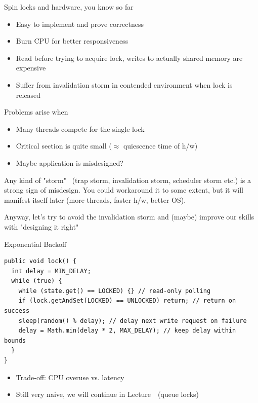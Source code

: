\begin{frame}[fragile]{Spin locks and hardware, you know so far}

\begin{itemize}
  \item Easy to implement and prove correctness
  \item Burn CPU for better responsiveness
  \item Read before trying to acquire lock, writes to actually shared memory are expensive
  \item Suffer from invalidation storm in contended environment when lock is released
\end{itemize}

\pause

Problems arise when
\begin{itemize}
  \pause
  \item Many threads compete for the single lock
  \pause
  \item Critical section is quite small ($\approx$ quiescence time of h/w)
  \pause
  \item Maybe application is misdesigned?
\end{itemize}

\pause

Any kind of "storm" \ (trap storm, invalidation storm, scheduler storm etc.) is a strong sign of misdesign. \pause
You could workaround it to some extent, but it will manifest itself later (more threads, faster h/w, better OS).

\pause
Anyway, let's try to avoid the invalidation storm and (maybe) improve our skills with "designing it right"

\end{frame}


% 
% 
% 


\begin{frame}[fragile]{Exponential Backoff}

\begin{verbatim}
public void lock() {
  int delay = MIN_DELAY;
  while (true) {
    while (state.get() == LOCKED) {} // read-only polling
    if (lock.getAndSet(LOCKED) == UNLOCKED) return; // return on success
    sleep(random() % delay); // delay next write request on failure
    delay = Math.min(delay * 2, MAX_DELAY); // keep delay within bounds    
  }
}
\end{verbatim}

\pause
\begin{itemize}
  \item Trade-off: CPU overuse vs. latency
  \pause
  \item Still very naive, we will continue in Lecture~\advancedConcurrencyNum \ (queue locks)
\end{itemize}
\end{frame}


